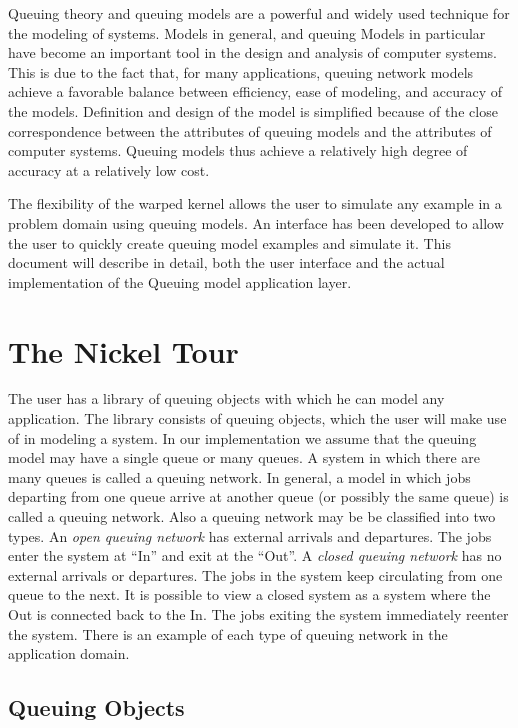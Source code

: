 \documentclass[11pt]{report}
\begin{document}
Queuing theory and queuing models are a powerful and widely used
technique for the modeling of systems.  Models in general, and queuing
Models in particular have become an important tool in the design and
analysis of computer systems.  This is due to the fact that, for many
applications, queuing network models achieve a favorable balance between
efficiency, ease of modeling, and accuracy of the models.  Definition
and design of the model is simplified because of the close
correspondence between the attributes of queuing models and the
attributes of computer systems.  Queuing models thus achieve a
relatively high degree of accuracy at a relatively low cost.

The flexibility of the warped kernel allows the user to simulate any
example in a problem domain using queuing models.  An interface has been
developed to allow the user to quickly create queuing model examples
and simulate it.  This document will describe in detail, both the user
interface and the actual implementation of the Queuing model application
layer.

\chapter{The Nickel Tour}

The user has a library of queuing objects with which he can model any
application.  The library consists of queuing objects, which the user
will make use of in modeling a system.  In our implementation we assume
that the queuing model may have a single queue or many queues.  A system
in which there are many queues is called a queuing network.  In general,
a model in which jobs departing from one queue arrive at another queue
(or possibly the same queue) is called a queuing network.  Also a
queuing network may be be classified into two types.  An {\it open
queuing network} has external arrivals and departures.  The jobs enter
the system at ``In'' and exit at the ``Out''.  A {\it closed queuing
network} has no external arrivals or departures.  The jobs in the system
keep circulating from one queue to the next.  It is possible to view a
closed system as a system where the Out is connected back to the In.
The jobs exiting the system immediately reenter the system.  There is an
example of each type of queuing network in the application domain.

\section{Queuing Objects}
\end{document}
